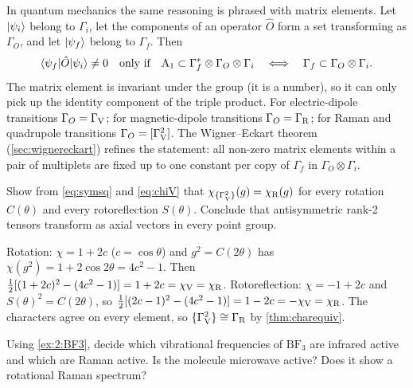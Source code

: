 \begin{beyond}
In quantum mechanics the same reasoning is phrased with matrix elements. Let
$\lvert \psi_i\rangle$ belong to $\Gamma_i$, let the components of an operator $\hat{O}$ form a
set transforming as $\Gamma_O$, and let $\lvert \psi_f\rangle$ belong to $\Gamma_f$. Then
\[
\langle \psi_f\rvert\hat{O}\lvert \psi_i\rangle\neq0\quad\text{only if}\quad
\mathrm{A}_1\subset\Gamma_f^{*}\otimes\Gamma_O\otimes\Gamma_i
\quad\Longleftrightarrow\quad
\Gamma_f\subset\Gamma_O\otimes\Gamma_i .
\]
The matrix element is invariant under the group (it is a number), so it can only
pick up the identity component of the triple product. For electric-dipole transitions
$\Gamma_O=\Gamma_{\mathrm{V}}$; for magnetic-dipole transitions $\Gamma_O=\Gamma_{\mathrm{R}}$; for Raman and
quadrupole transitions $\Gamma_O=[\Gamma_{\mathrm{V}}^2]$. The Wigner--Eckart theorem
(\cref{sec:wignereckart}) refines the statement: all non-zero matrix elements within a
pair of multiplets are fixed up to one constant per copy of $\Gamma_f$ in
$\Gamma_O\otimes\Gamma_i$.
\end{beyond}

\exercisesection

\begin{exercise}\label{ex:4:antisym}
Show from \eqref{eq:symsq} and \eqref{eq:chiV} that $\chi_{\{\Gamma_{\mathrm{V}}^2\}}(g)=\chi_{\mathrm{R}}(g)$
for every rotation $C(\theta)$ and every rotoreflection $S(\theta)$. Conclude that
antisymmetric rank-2 tensors transform as axial vectors in every point group.
\end{exercise}

\begin{solution}
Rotation: $\chi=1+2c$ ($c=\cos\theta$) and $g^2=C(2\theta)$ has $\chi(g^2)=1+2\cos2\theta=4c^2-1$.
Then $\tfrac12[(1+2c)^2-(4c^2-1)]=1+2c=\chi_{\mathrm{V}}=\chi_{\mathrm{R}}$. Rotoreflection: $\chi=-1+2c$ and
$S(\theta)^2=C(2\theta)$, so $\tfrac12[(2c-1)^2-(4c^2-1)]=1-2c=-\chi_{\mathrm{V}}=\chi_{\mathrm{R}}$. The characters
agree on every element, so $\{\Gamma_{\mathrm{V}}^2\}\cong\Gamma_{\mathrm{R}}$ by \cref{thm:charequiv}.
\end{solution}

\begin{exercise}[$\mathrm{BF_3}$]\label{ex:4:BF3}
Using \cref{ex:2:BF3}, decide which vibrational frequencies of $\mathrm{BF_3}$ are
infrared active and which are Raman active. Is the molecule microwave active? Does it
show a rotational Raman spectrum?
\end{exercise}

